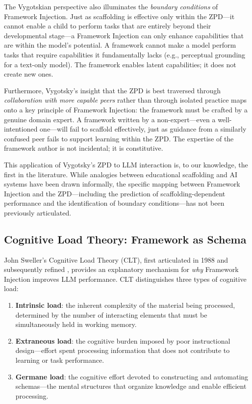 \documentclass[12pt,a4paper]{article}
\begin{document}
The Vygotskian perspective also illuminates the \emph{boundary conditions} of Framework Injection. Just as scaffolding is effective only within the ZPD---it cannot enable a child to perform tasks that are entirely beyond their developmental stage---a Framework Injection can only enhance capabilities that are within the model's potential. A framework cannot make a model perform tasks that require capabilities it fundamentally lacks (e.g., perceptual grounding for a text-only model). The framework enables latent capabilities; it does not create new ones.

Furthermore, Vygotsky's insight that the ZPD is best traversed through \emph{collaboration with more capable peers} rather than through isolated practice maps onto a key principle of Framework Injection: the framework must be crafted by a genuine domain expert. A framework written by a non-expert---even a well-intentioned one---will fail to scaffold effectively, just as guidance from a similarly confused peer fails to support learning within the ZPD. The expertise of the framework author is not incidental; it is constitutive.

This application of Vygotsky's ZPD to LLM interaction is, to our knowledge, the first in the literature. While analogies between educational scaffolding and AI systems have been drawn informally, the specific mapping between Framework Injection and the ZPD---including the prediction of scaffolding-dependent performance and the identification of boundary conditions---has not been previously articulated.

\subsection{Cognitive Load Theory: Framework as Schema}
\label{sec:theory:sweller}

John Sweller's Cognitive Load Theory (CLT), first articulated in 1988 \citep{sweller1988cognitive} and subsequently refined \citep{sweller2011cognitive}, provides an explanatory mechanism for \emph{why} Framework Injection improves LLM performance. CLT distinguishes three types of cognitive load:

\begin{enumerate}
    \item \textbf{Intrinsic load}: the inherent complexity of the material being processed, determined by the number of interacting elements that must be simultaneously held in working memory.

    \item \textbf{Extraneous load}: the cognitive burden imposed by poor instructional design---effort spent processing information that does not contribute to learning or task performance.

    \item \textbf{Germane load}: the cognitive effort devoted to constructing and automating schemas---the mental structures that organize knowledge and enable efficient processing.
\end{enumerate}
\end{document}
